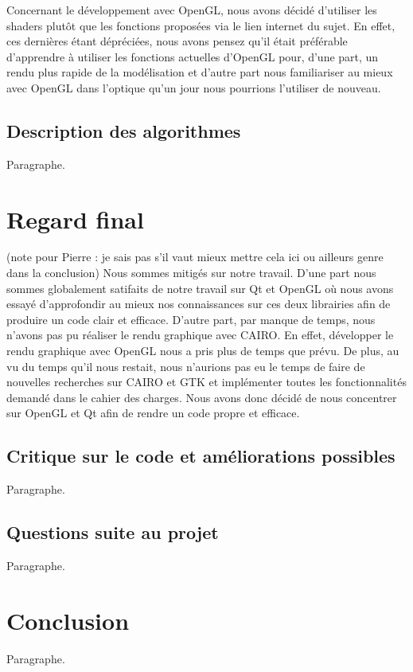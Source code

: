 \documentclass[11pt]{article}
\begin{document}
Concernant le développement avec OpenGL, nous avons décidé d'utiliser 
les shaders plutôt que les fonctions proposées via le lien internet du 
sujet. En effet, ces dernières étant dépréciées, nous avons pensez 
qu'il était préférable d'apprendre à utiliser les fonctions actuelles 
d'OpenGL pour, d'une part, un rendu plus rapide de la modélisation et 
d'autre part nous familiariser au mieux avec OpenGL dans l'optique 
qu'un jour nous pourrions l'utiliser de nouveau. 

\subsection{Description des algorithmes}

Paragraphe.

\section{Regard final}

(note pour Pierre : je sais pas s'il vaut mieux mettre cela ici ou ailleurs
genre dans la conclusion)
Nous sommes mitigés sur notre travail. D'une part nous sommes globalement 
satifaits de notre travail sur Qt et OpenGL où nous avons essayé 
d'approfondir au mieux nos connaissances sur ces deux librairies afin de 
produire un code clair et efficace. D'autre part, par manque de temps, 
nous n'avons pas pu réaliser le rendu graphique avec CAIRO. En effet, 
développer le rendu graphique avec OpenGL nous a pris plus de temps 
que prévu. De plus, au vu du temps qu'il nous restait, nous n'aurions
pas eu le temps de faire de nouvelles recherches sur CAIRO et GTK et 
implémenter toutes les fonctionnalités demandé dans le cahier des charges.
Nous avons donc décidé de nous concentrer sur OpenGL et Qt afin de rendre 
un code propre et efficace.

\subsection{Critique sur le code et améliorations possibles}

Paragraphe.

\subsection{Questions suite au projet}

Paragraphe.

\section{Conclusion}

Paragraphe.
\end{document}
